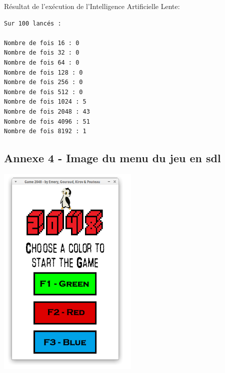 \documentclass[a4paper]{article}
\begin{document}
\noindent
Résultat de l'exécution de l'Intelligence Artificielle Lente:
\begin{verbatim}
Sur 100 lancés : 

Nombre de fois 16 : 0
Nombre de fois 32 : 0
Nombre de fois 64 : 0
Nombre de fois 128 : 0
Nombre de fois 256 : 0
Nombre de fois 512 : 0
Nombre de fois 1024 : 5
Nombre de fois 2048 : 43
Nombre de fois 4096 : 51
Nombre de fois 8192 : 1
\end{verbatim}

\newpage
\subsection{Annexe 4 - Image du menu du jeu en sdl}
\label{sec-7-4}
\noindent
\includegraphics{screenshot-menu-jeu-sdl.png}
\end{document}
